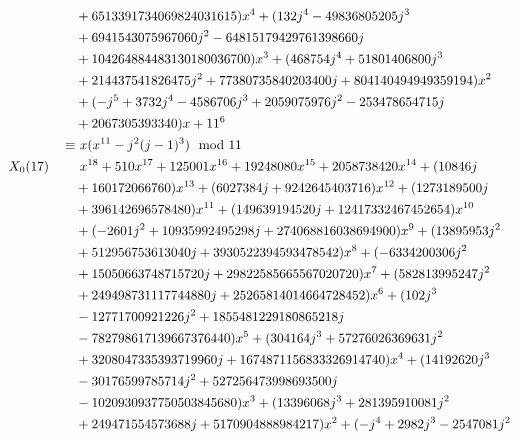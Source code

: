 \documentclass{rs}
\theoremstyle{definition}
\theoremstyle{remark}
\newcommand{\md}{~~{\rm mod}~}
\renewcommand{\=}{\approx}
\renewcommand{\-}{\sim}
\numberwithin{equation}{section}
\numberwithin{thm}{section}
\begin{document}
\begin{enumerate}[(i)]
\begin{itemize}
\begin{equation*}
\begin{split}
   \end{split}
  \end{equation*}
  \begin{equation*}
   \begin{split}
                   & +6513391734069824031615) x^4+(132 j^4-49836805205 j^3 \\
                   & +6941543075967060 j^2-64815179429761398660 j \\
                   & +104264884483130180036700) x^3+(468754 j^4+51801406800 j^3 \\
                   & +214437541826475 j^2+77380735840203400 j+804140494949359194) x^2 \\
                   & +(-j^5+3732 j^4-4586706 j^3+2059075976 j^2-253478654715 j \\
                   & +2067305393340) x+11^6 \\
            \equiv & ~ x (x^{11} - j^2 (j - 1)^3) \md 11 \\
    X_0(17) \qquad & ~ x^{18}+510 x^{17}+125001 x^{16}+19248080 x^{15}+2058738420 x^{14}+(10846 j \\
                   & +160172066760) x^{13}+(6027384 j+9242645403716) x^{12}+(1273189500 j \\
                   & +396142696578480) x^{11}+(149639194520 j+12417332467452654) x^{10} \\
                   & +(-2601 j^2+10935992495298 j+274068816038694900) x^9+(13895953 j^2 \\
                   & +512956753613040 j+3930522394593478542) x^8+(-6334200306 j^2 \\
                   & +15050663748715720 j+29822585665567020720) x^7+(582813995247 j^2 \\
                   & +249498731117744880 j+25265814014664728452) x^6+(102 j^3 \\
                   & -12771700921226 j^2+1855481229180865218 j \\
                   & -782798617139667376440) x^5+(304164 j^3+57276026369631 j^2 \\
                   & +3208047335393719960 j+1674871156833326914740) x^4+(14192620 j^3 \\
                   & -30176599785714 j^2+527256473998693500 j \\
                   & -1020930937750503845680) x^3+(13396068 j^3+281395910081 j^2 \\
                   & +249471554573688 j+5170904888984217) x^2+(-j^4+2982 j^3-2547081 j^2 \\

\end{split}
\end{equation*}
\end{itemize}
\end{enumerate}
\end{document}
